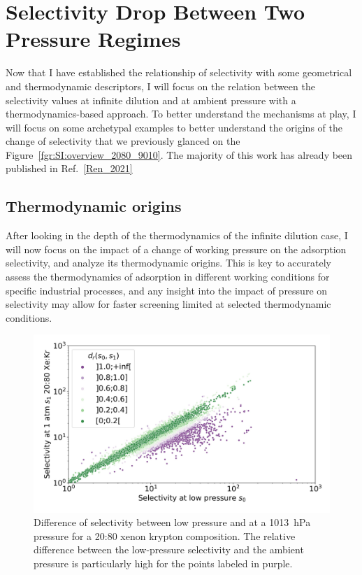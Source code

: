 \documentclass[main.tex]{subfiles}
\begin{document}
\section{Selectivity Drop Between Two Pressure Regimes}

Now that I have established the relationship of selectivity with some geometrical and thermodynamic descriptors, I will focus on the relation between the selectivity values at infinite dilution and at ambient pressure with a thermodynamics-based approach. To better understand the mechanisms at play, I will focus on some archetypal examples to better understand the origins of the change of selectivity that we previously glanced on the Figure~\ref{fgr:SI:overview_2080_9010}. The majority of this work has already been published in Ref.~\ref{Ren_2021}

\subsection{Thermodynamic origins}\label{section:pressure}

After looking in the depth of the thermodynamics of the infinite dilution case, I will now focus on the impact of a change of working pressure on the adsorption selectivity, and analyze its thermodynamic origins. This is key to accurately assess the thermodynamics of adsorption in different working conditions for specific industrial processes, and any insight into the impact of pressure on selectivity may allow for faster screening limited at selected thermodynamic conditions.

\begin{figure}[ht]
  \centering
    \includegraphics[width=0.6\linewidth]{figures/2-thermo/s_0_vs_s_2080_overview_log.jpg}
    \caption{Difference of selectivity between low pressure and at a \SI{1013}{\hecto\pascal} pressure for a 20:80 xenon krypton composition. The relative difference between the low-pressure selectivity and the ambient pressure is particularly high for the points labeled in purple.}\label{fgr:overview}
\end{figure}
\end{document}
